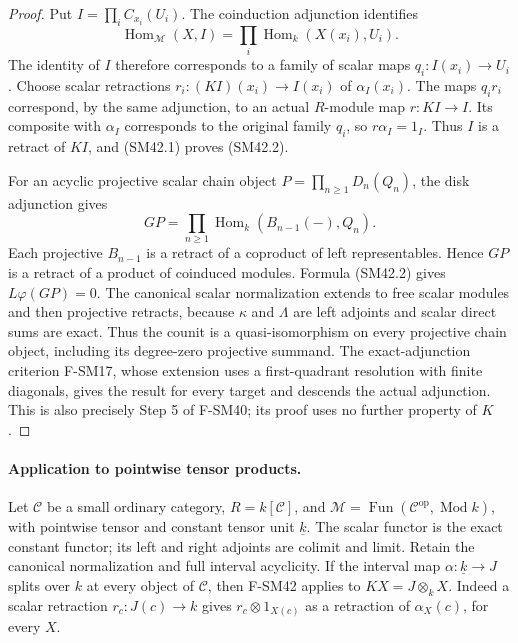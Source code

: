 \begin{proof}
Put \(I=\prod_iC_{x_i}(U_i)\).  The coinduction adjunction
identifies
\[
 \operatorname{Hom}_{\mathcal M}(X,I)
          =\prod_i\operatorname{Hom}_k(X(x_i),U_i).
                                                               \tag{SM42.3}
\]
The identity of \(I\) therefore corresponds to a family
of scalar maps \(q_i:I(x_i)\to U_i\).  Choose scalar
retractions \(r_i:(KI)(x_i)\to I(x_i)\) of
\(\alpha_I(x_i)\).  The maps \(q_i r_i\) correspond,
by the same adjunction, to an actual \(R\)-module map
\(r:KI\to I\).  Its composite with \(\alpha_I\)
corresponds to the original family \(q_i\), so
\(r\alpha_I=1_I\).  Thus \(I\) is a retract of
\(KI\), and (SM42.1) proves (SM42.2).

For an acyclic projective scalar chain object
\(P=\prod_{n\ge1}D_n(Q_n)\), the disk adjunction gives
\[
               GP=\prod_{n\ge1}\operatorname{Hom}_k(B_{n-1}(-),Q_n).
                                                               \tag{SM42.4}
\]
Each projective \(B_{n-1}\) is a retract of a coproduct
of left representables.  Hence \(GP\) is a retract of
a product of coinduced modules.  Formula (SM42.2) gives
\(L\varphi(GP)=0\).  The canonical scalar normalization
extends to free scalar modules and then projective
retracts, because \(\kappa\) and \(\Lambda\) are left
adjoints and scalar direct sums are exact.  Thus the
counit is a quasi-isomorphism on every projective chain
object, including its degree-zero projective summand.
The exact-adjunction criterion F-SM17, whose extension
uses a first-quadrant resolution with finite diagonals,
gives the result for every target and descends the actual
adjunction.  This is also precisely Step 5 of F-SM40;
its proof uses no further property of \(K\).
\end{proof}

\paragraph{Application to pointwise tensor products.}
Let \(\mathcal C\) be a small ordinary category,
\(R=k[\mathcal C]\), and
\(\mathcal M=\operatorname{Fun}(\mathcal C^{\mathrm{op}},
\operatorname{Mod}k)\), with pointwise tensor and
constant tensor unit \(\underline{k}\).  The scalar
functor is the exact constant functor; its left and
right adjoints are colimit and limit.  Retain the
canonical normalization and full interval acyclicity.
If the interval map
\(\alpha:\underline{k}\to J\) splits over \(k\) at
every object of \(\mathcal C\), then F-SM42 applies
to \(KX=J\otimes_kX\).  Indeed a scalar retraction
\(r_c:J(c)\to k\) gives
\(r_c\otimes1_{X(c)}\) as a retraction of
\(\alpha_X(c)\), for every \(X\).

